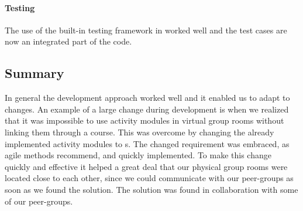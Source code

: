\paragraph{Testing}
The use of the built-in testing framework in \moodle{} worked well and the test cases are now an integrated part of the code.


\subsection{Summary}
In general the development approach worked well and it enabled us to adapt to changes. 
An example of a large change during development is when we realized that it was impossible to use activity modules in virtual group rooms without linking them through a course.
This was overcome by changing the already implemented activity modules to \block[]s. 
The changed requirement was embraced, as agile methods recommend, and quickly implemented.
To make this change quickly and effective it helped a great deal that our physical group rooms were located close to each other, since we could communicate with our peer-groups as soon as we found the solution.
The solution was found in collaboration with some of our peer-groups.